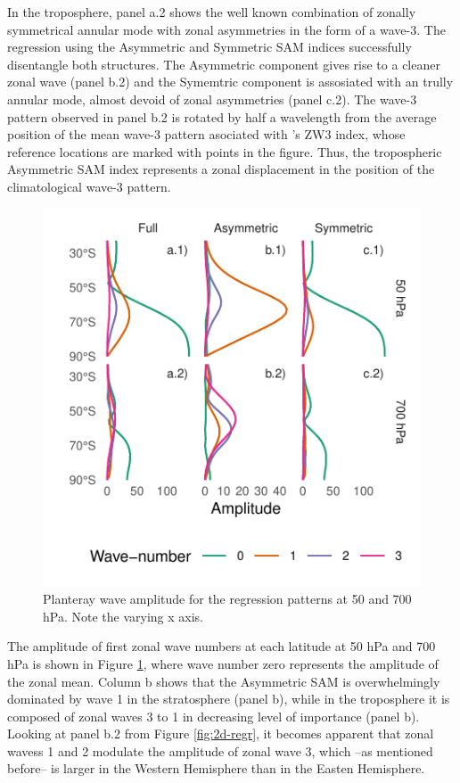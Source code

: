 \documentclass[twocol]{ametsocV5}
\begin{document}
In the troposphere, panel a.2 shows the well known combination of
zonally symmetrical annular mode with zonal asymmetries in the form of a
wave-3. The regression using the Asymmetric and Symmetric SAM indices
successfully disentangle both structures. The Asymmetric component gives
rise to a cleaner zonal wave (panel b.2) and the Symemtric component is
assosiated with an trully annular mode, almost devoid of zonal
asymmetries (panel c.2). The wave-3 pattern observed in panel b.2 is
rotated by half a wavelength from the average position of the mean
wave-3 pattern asociated with \citet{raphael2004}'s ZW3 index, whose
reference locations are marked with points in the figure. Thus, the
tropospheric Asymmetric SAM index represents a zonal displacement in the
position of the climatological wave-3 pattern.

\begin{figure}
\includegraphics{wave-amplitude-1} \caption[Planteray wave amplitude for the regression patterns at 50 and 700 hPa]{Planteray wave amplitude for the regression patterns at 50 and 700 hPa. Note the varying x axis.}\label{fig:wave-amplitude}
\end{figure}

The amplitude of first zonal wave numbers at each latitude at 50 hPa and
700 hPa is shown in Figure \ref{fig:wave-amplitude}, where wave number
zero represents the amplitude of the zonal mean. Column b shows that the
Asymmetric SAM is overwhelmingly dominated by wave 1 in the stratosphere
(panel b), while in the troposphere it is composed of zonal waves 3 to 1
in decreasing level of importance (panel b). Looking at panel b.2 from
Figure \ref{fig:2d-regr}, it becomes apparent that zonal wavess 1 and 2
modulate the amplitude of zonal wave 3, which --as mentioned before-- is
larger in the Western Hemisphere than in the Easten Hemisphere.
\end{document}
